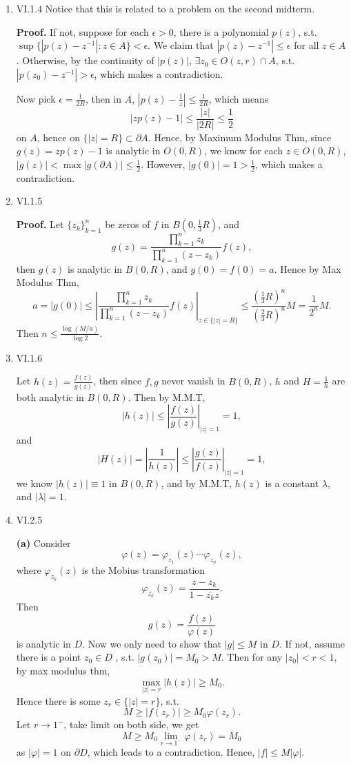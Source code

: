 \documentclass{article}%
\begin{document}
\begin{enumerate}


\item VI.1.4  Notice that this is related to a problem on the second midterm.

\textbf{Proof.}
If not, suppose for each $\epsilon > 0$, there is a polynomial $p(z)$, s.t. $\sup\{|p(z) - z^{-1}| : z\in A\} < \epsilon$. We claim that $|p(z) - z^{-1}| \le \epsilon$ for all $z\in A$. Otherwise, by the continuity of $|p(z)|$, $\exists z_0\in O(z, r)\cap A $, s.t. $|p(z_0)-z^{-1}| > \epsilon$, which makes a contradiction.

Now pick $\epsilon = \frac{1}{2R}$, then in $A$, $|p(z)-\frac{1}{z}| \le \frac{1}{2R}$, which means
$$
|zp(z)-1|\le \frac{|z|}{|2R|} \le \frac{1}{2}
$$
on $A$, hence on $\{|z| = R\}\subset\partial A$. Hence, by Maximum Modulus Thm, since $g(z) = zp(z)-1$ is analytic in $O(0, R)$, we know for each $z\in O(0, R)$, $|g(z)| < \max|g(\partial A)| \le \frac{1}{2}$. However, $|g(0)| = 1 > \frac{1}{2}$, which makes a contradiction.


\item VI.1.5

\textbf{Proof.}
Let $\{z_k\}_{k=1}^n $ be zeros of $f$ in $B(0, \frac{1}{3}R)$, and 
$$
g(z) = \frac{\prod_{k=1}^{n}z_k}{\prod_{k=1}^{n}(z-z_k)}f(z),
$$
then $g(z)$ is analytic in $B(0, R)$, and $g(0) = f(0) = a$. Hence by Max Modulus Thm,
$$
a = |g(0)| \le \left| \frac{\prod_{k=1}^{n}z_k}{\prod_{k=1}^{n}(z-z_k)}f(z)\right|_{z\in\{|z| = R\}} \le \frac{(\frac{1}{3}R)^n}{(\frac{2}{3}R)^n}M = \frac{1}{2^n}M.
$$
Then $n \le \frac{\log (M/a)}{\log 2}$.


\item VI.1.6

Let $h(z) = \frac{f(z)}{g(z)}$, then since $f, g$ never vanish in $B(0, R)$, $h$ and $H = \frac{1}{h}$ are both analytic in $B(0, R)$. Then by M.M.T,
$$
|h(z)| \le \left|\frac{f(z)}{g(z)}\right|_{|z| = 1} = 1, 
$$
and
$$
|H(z)| = \left|\frac{1}{h(z)}\right| \le \left|\frac{g(z)}{f(z)}\right|_{|z| = 1} = 1,
$$
we know $|h(z)| \equiv 1$ in $B(0, R)$, and by M.M.T, $h(z)$ is a constant $\lambda$, and $|\lambda| = 1$.

\item VI.2.5

\textbf{(a)}
Consider 
$$
\varphi(z) = \varphi_{z_1}(z)\cdots\varphi_{z_n}(z),
$$
where $\varphi_{z_k}(z) $ is the Mobius transformation 
$$
\varphi_{z_k}(z) = \frac{z-z_k}{1-\bar{z_k}z}.
$$
Then 
$$
g(z) = \frac{f(z)}{\varphi(z)}
$$
is analytic in $D$. Now we only need to show that $|g| \le M$ in $D$. If not, assume there is a point $z_0\in D $ , s.t. $|g(z_0)| = M_0 > M $. Then for any $|z_0| < r < 1$, by max modulus thm, 
$$
\max_{|z| = r}|h(z)| \ge M_0.
$$
Hence there is some $z_r\in \{|z| = r\}$, s.t.
$$
M \ge |f(z_r)| \ge M_0\varphi(z_r).
$$
Let $r\to 1^- $, take limit on both side, we get
$$
M \ge M_0\lim_{r\to 1^-}\varphi(z_r) = M_0
$$
as $|\varphi| = 1$ on $\partial D$, which leads to a contradiction. Hence, $|f| \le M|\varphi|$.


\end{enumerate}
\end{document}

